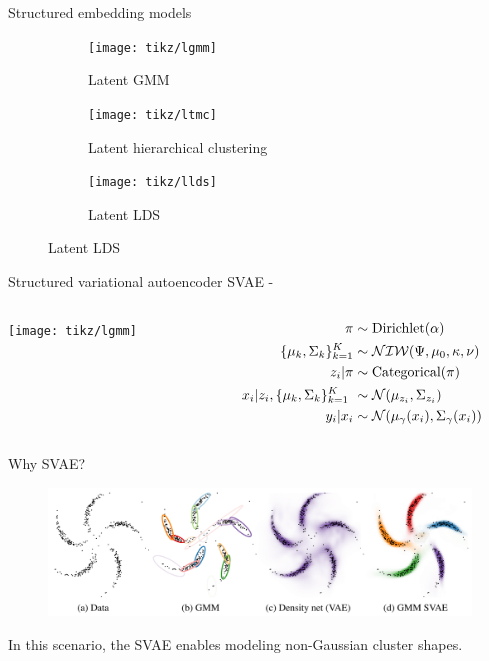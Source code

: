 \documentclass[10pt, compress]{beamer}
\begin{document}
\begin{frame}{Structured embedding models}
  \begin{figure}
    \centering
    \pause
    \begin{subfigure}[t]{0.27\textwidth}
        \centering
        \texttt{[image: tikz/lgmm]}
        \caption*{Latent GMM}
    \end{subfigure}
    \pause
    \hfill
    \begin{subfigure}[t]{0.27\textwidth}
        \centering
        \texttt{[image: tikz/ltmc]}
        \caption*{Latent hierarchical clustering}
    \end{subfigure}
    \pause
    \hfill
    \begin{subfigure}[t]{0.27\textwidth}
        \centering
        \texttt{[image: tikz/llds]}
        \caption*{Latent LDS}
    \end{subfigure}
  \end{figure}
\end{frame}

\begin{frame}{Structured variational autoencoder}
  SVAE - \cite{Johnson2016}
  \centering
  \begin{columns}
    \begin{column}{0.3\textwidth}
      \texttt{[image: tikz/lgmm]}
    \end{column}
    \begin{column}{0.3\textwidth}
      \begin{align*}
        \pi &\sim \textrm{Dirichlet}(\alpha) \\
        \{\mu_k, \Sigma_k\}_{k = 1}^K &\sim \mathcal{NIW}(\Psi, \mu_0, \kappa, \nu) \\
        z_i | \pi &\sim \textrm{Categorical}(\pi) \\
        x_i | z_i, \{\mu_k, \Sigma_k\}_{k = 1}^K \ &\sim \mathcal{N}(\mu_{z_i}, \Sigma_{z_i}) \\
        y_i | x_i &\sim \mathcal{N}(\mu_\gamma(x_i), \Sigma_\gamma(x_i))
      \end{align*}
    \end{column}
  \end{columns}
\end{frame}

\begin{frame}{Why SVAE?}
  \begin{center}
    \begin{figure}
    \includegraphics[frame,width=\textwidth]{img/svae-example}
    \caption{\cite{Johnson2016}}
    \end{figure}
  \end{center}

  \pause
  In this scenario, the SVAE enables modeling non-Gaussian cluster shapes.
\end{frame}
\end{document}
